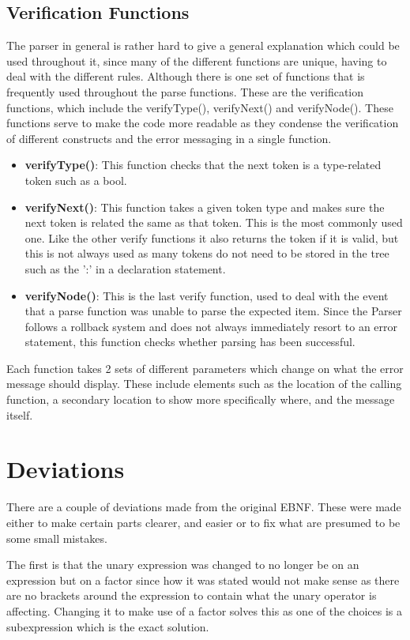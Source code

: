 \documentclass[12pt, a4paper]{report}
\begin{document}
\subsection{Verification Functions}
The parser in general is rather hard to give a general explanation which could be used throughout it, since many of the different functions are unique, having to deal with the different rules. Although there is one set of functions that is frequently used throughout the parse functions. These are the verification functions, which include the verifyType(), verifyNext() and verifyNode(). These functions serve to make the code more readable as they condense the verification of different constructs and the error messaging in a single function.

\begin{itemize}
    \item \textbf{verifyType()}: This function checks that the next token is a type-related token such as a bool.
    \item \textbf{verifyNext()}: This function takes a given token type and makes sure the next token is related the same as that token. This is the most commonly used one. Like the other verify functions it also returns the token if it is valid, but this is not always used as many tokens do not need to be stored in the tree such as the ':' in a declaration statement.
    \item \textbf{verifyNode()}: This is the last verify function, used to deal with the event that a parse function was unable to parse the expected item. Since the Parser follows a rollback system and does not always immediately resort to an error statement, this function checks whether parsing has been successful.
\end{itemize}

Each function takes 2 sets of different parameters which change on what the error message should display. These include elements such as the location of the calling function, a secondary location to show more specifically where, and the message itself.

\section{Deviations}
There are a couple of deviations made from the original EBNF. These were made either to make certain parts clearer, and easier or to fix what are presumed to be some small mistakes.

The first is that the unary expression was changed to no longer be on an expression but on a factor since how it was stated would not make sense as there are no brackets around the expression to contain what the unary operator is affecting. Changing it to make use of a factor solves this as one of the choices is a subexpression which is the exact solution.
\end{document}
